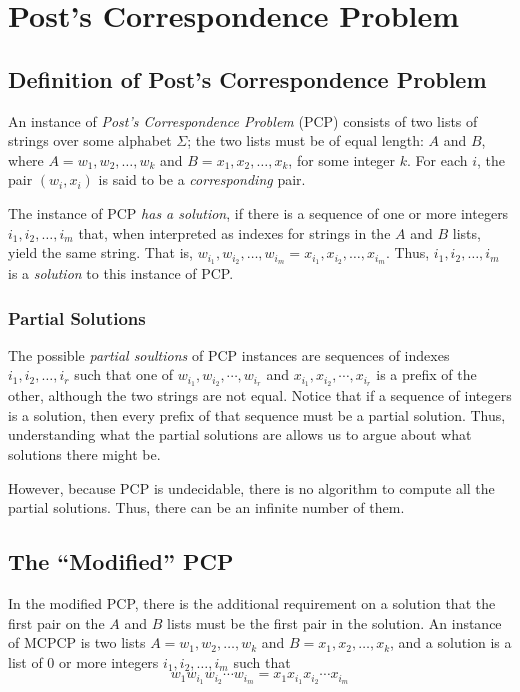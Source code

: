 \documentclass[]{article}
\begin{document}
\section*{Post's Correspondence Problem}
\subsection*{Definition of Post's Correspondence Problem}
An instance of \emph{Post's Correspondence Problem} (PCP) consists of two lists
of strings over some alphabet $\Sigma$; the two lists must be of equal length:
$A$ and $B$, where $A = w_1, w_2,\ldots,w_k$ and $B = x_1,x_2,\ldots,x_k$, for
some integer $k$. For each $i$, the pair $(w_i,x_i)$ is said to be a
\emph{corresponding} pair.

The instance of PCP \emph{has a solution}, if there is a sequence of one or more
integers $i_1, i_2,\ldots,i_m$ that, when interpreted as indexes for strings in
the $A$ and $B$ lists, yield the same string. That is,
$w_{i_1},w_{i_2},\ldots,w_{i_m} = x_{i_1},x_{i_2},\ldots,x_{i_m}$. Thus,
$i_1,i_2,\ldots,i_m$ is a \emph{solution} to this instance of PCP.

\subsubsection*{Partial Solutions}
The possible \emph{partial soultions} of PCP instances are sequences of indexes
$i_1, i_2, \ldots, i_r$ such that one of $w_{i_1}, w_{i_2}, \cdots, w_{i_r}$ and
$x_{i_1}, x_{i_2}, \cdots, x_{i_r}$ is a prefix of the other, although the two
strings are not equal. Notice that if a sequence of integers is a solution, then
every prefix of that sequence must be a partial solution. Thus, understanding
what the partial solutions are allows us to argue about what solutions there
might be.

However, because PCP is undecidable, there is no algorithm to compute all the
partial solutions. Thus, there can be an infinite number of them.

\subsection*{The ``Modified'' PCP}
In the modified PCP, there is the additional requirement on a solution that the
first pair on the $A$ and $B$ lists must be the first pair in the solution. An
instance of MCPCP is two lists $A = w_1, w_2, \ldots, w_k$ and $B =
x_1,x_2,\ldots,x_k$, and a solution is a list of 0 or more integers
$i_1,i_2,\ldots,i_m$ such that
\[ w_1w_{i_1}w_{i_2}\cdots w_{i_m} = x_1x_{i_1}x_{i_2}\cdots x_{i_m} \]
\end{document}
